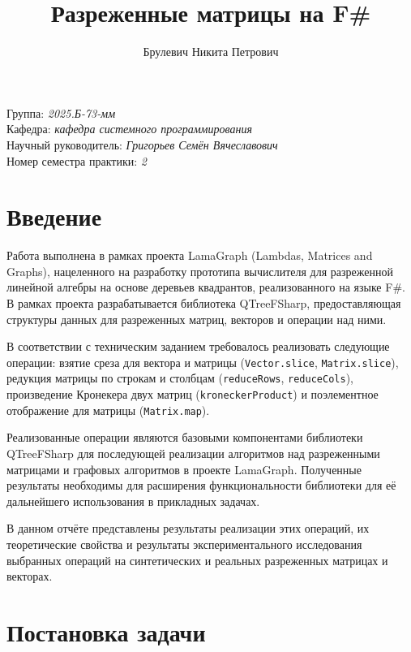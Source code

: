 \documentclass[a4paper]{article}
\title{Разреженные матрицы на F\#}
\author{Брулевич Никита Петрович}
\date{}
\begin{document}
\sloppy

\maketitle

\begin{flushright}
    Группа: \emph{2025.Б-73-мм} \\
    Кафедра: \emph{кафедра системного программирования} \\
    Научный руководитель: \emph{Григорьев Семён Вячеславович} \\
    Номер семестра практики: \emph{2}
\end{flushright}

\section*{Введение}

Работа выполнена в рамках проекта LamaGraph (Lambdas, Matrices and Graphs), нацеленного на разработку прототипа вычислителя для разреженной линейной алгебры на основе деревьев квадрантов, реализованного на языке F\#. В рамках проекта разрабатывается библиотека QTreeFSharp, предоставляющая структуры данных для разреженных матриц, векторов и операции над ними.

В соответствии с техническим заданием требовалось реализовать следующие операции: взятие среза для вектора и матрицы (\texttt{Vector.slice}, \texttt{Matrix.slice}), редукция матрицы по строкам и столбцам (\texttt{reduceRows}, \texttt{reduceCols}), произведение Кронекера двух матриц (\texttt{kroneckerProduct}) и поэлементное отображение для матрицы (\texttt{Matrix.map}).

Реализованные операции являются базовыми компонентами библиотеки QTreeFSharp для последующей реализации алгоритмов над разреженными матрицами и графовых алгоритмов в проекте LamaGraph. Полученные результаты необходимы для расширения функциональности библиотеки для её дальнейшего использования в прикладных задачах.

В данном отчёте представлены результаты реализации этих операций, их теоретические свойства и результаты экспериментального исследования выбранных операций на синтетических и реальных разреженных матрицах и векторах.

\section{Постановка задачи}
\end{document}

